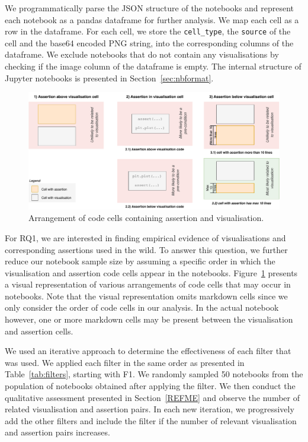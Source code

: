 \documentclass[acmsmall,screen,review,anonymous]{acmart}
\begin{document}
We programmatically parse the JSON structure of the notebooks and represent each notebook as a pandas dataframe for further analysis. We map each cell as a row in the dataframe. For each cell, we store the \texttt{cell\_type}, the \texttt{source} of the cell and the base64 encoded PNG string, into the corresponding columns of the dataframe. We exclude notebooks that do not contain any visualisations by checking if the image column of the dataframe is empty. The internal structure of Jupyter notebooks is presented in Section~\ref{sec:nbformat}.

\begin{figure}
  \centering
  \includegraphics[width=\textwidth]{nb-structure.pdf}
  \caption{Arrangement of code cells containing assertion and
    visualisation.}
  \label{fig:cell-arrangement}
\end{figure}

For RQ1, we are interested in finding empirical evidence of visualisations and corresponding assertions used in the wild. To answer this question, we further reduce our notebook sample size by assuming a specific order in which the visualisation and assertion code cells appear in the notebooks. Figure~\ref{fig:cell-arrangement} presents a visual representation of various arrangements of code cells that may occur in notebooks. Note that the visual representation omits markdown cells since we only consider the order of code cells in our analysis. In the actual notebook however, one or more markdown cells may be present between the visualisation and assertion cells.


We used an iterative approach to determine the effectiveness of each
filter that was used. We applied each filter in the same order as
presented in Table~\ref{tab:filters}, starting with F1. We randomly
sampled 50 notebooks from the population of notebooks obtained after
applying the filter. We then conduct the qualitative assessment
presented in Section~\ref{REFME} and observe the number of related
visualisation and assertion pairs. In each new iteration, we
progressively add the other filters and include the filter if the
number of relevant visualisation and assertion pairs increases.
\end{document}
